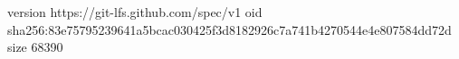 version https://git-lfs.github.com/spec/v1
oid sha256:83e75795239641a5bcac030425f3d8182926c7a741b4270544e4e807584dd72d
size 68390
